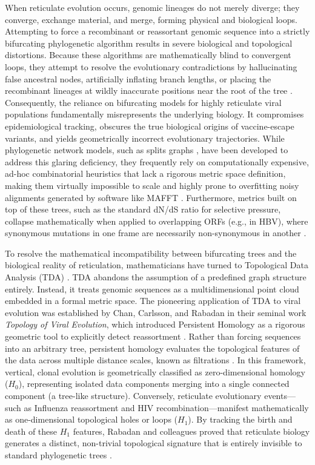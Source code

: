 When reticulate evolution occurs, genomic lineages do not merely diverge; they converge, exchange material, and merge, forming physical and biological loops. Attempting to force a recombinant or reassortant genomic sequence into a strictly bifurcating phylogenetic algorithm results in severe biological and topological distortions. Because these algorithms are mathematically blind to convergent loops, they attempt to resolve the evolutionary contradictions by hallucinating false ancestral nodes, artificially inflating branch lengths, or placing the recombinant lineages at wildly inaccurate positions near the root of the tree \citep{huson2006application}. Consequently, the reliance on bifurcating models for highly reticulate viral populations fundamentally misrepresents the underlying biology. It compromises epidemiological tracking, obscures the true biological origins of vaccine-escape variants, and yields geometrically incorrect evolutionary trajectories. While phylogenetic network models, such as splits graphs \citep{huson2006application}, have been developed to address this glaring deficiency, they frequently rely on computationally expensive, ad-hoc combinatorial heuristics that lack a rigorous metric space definition, making them virtually impossible to scale and highly prone to overfitting noisy alignments generated by software like MAFFT \citep{katoh2013mafft}. Furthermore, metrics built on top of these trees, such as the standard dN/dS ratio for selective pressure, collapse mathematically when applied to overlapping ORFs (e.g., in HBV), where synonymous mutations in one frame are necessarily non-synonymous in another \citep{schlub2018estimating}.

To resolve the mathematical incompatibility between bifurcating trees and the biological reality of reticulation, mathematicians have turned to Topological Data Analysis (TDA) \citep{carlsson2009topology, lum2013extracting}. TDA abandons the assumption of a predefined graph structure entirely. Instead, it treats genomic sequences as a multidimensional point cloud embedded in a formal metric space. The pioneering application of TDA to viral evolution was established by Chan, Carlsson, and Rabadan in their seminal work \textit{Topology of Viral Evolution}, which introduced Persistent Homology as a rigorous geometric tool to explicitly detect reassortment \citep{chan2013topology}. Rather than forcing sequences into an arbitrary tree, persistent homology evaluates the topological features of the data across multiple distance scales, known as filtrations \citep{edelsbrunner2000topological, zomorodian2005computing}. In this framework, vertical, clonal evolution is geometrically classified as zero-dimensional homology ($H_0$), representing isolated data components merging into a single connected component (a tree-like structure). Conversely, reticulate evolutionary events---such as Influenza reassortment and HIV recombination---manifest mathematically as one-dimensional topological holes or loops ($H_1$). By tracking the birth and death of these $H_1$ features, Rabadan and colleagues proved that reticulate biology generates a distinct, non-trivial topological signature that is entirely invisible to standard phylogenetic trees \citep{chan2013topology}.

